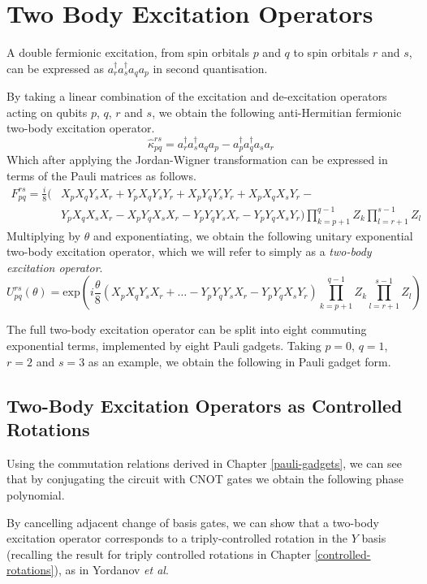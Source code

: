 \section{Two Body Excitation Operators}%
\label{two-body-excitation-operators}

A double fermionic excitation, from spin orbitals $p$ and $q$ to spin orbitals $r$ and $s$, can be expressed as $a^\dagger_r a^\dagger_s a_q a_p$ in second quantisation.

By taking a linear combination of the excitation and de-excitation operators acting on qubits $p$, $q$, $r$ and $s$, we obtain the following anti-Hermitian fermionic two-body excitation operator.
\begin{equation*}
    \hat{\kappa}_{pq}^{rs} = a^\dagger_r a^\dagger_s a_q a_p - a^\dagger_p a^\dagger_q a_s a_r
\end{equation*}
Which after applying the Jordan-Wigner transformation can be expressed in terms of the Pauli matrices as follows.
\begin{align*}
    F_{pq}^{rs} = \frac{i}{8} (
      & X_p X_q Y_s X_r +
        Y_p X_q Y_s Y_r +
        X_p Y_q Y_s Y_r +
        X_p X_q X_s Y_r - \\
      & Y_p X_q X_s X_r -
        X_p Y_q X_s X_r -
        Y_p Y_q Y_s X_r -
        Y_p Y_q X_s Y_r )
    \prod_{k=p+1}^{q-1} Z_k
    \prod_{l=r+1}^{s-1} Z_l
\end{align*}
Multiplying by $\theta$ and exponentiating, we obtain the following unitary exponential two-body excitation operator, which we will refer to simply as a \textit{two-body excitation operator}.
\begin{equation*}
    U^{rs}_{pq} (\theta) = \text{exp} \left( i \frac{\theta}{8} (
    X_p X_q Y_s X_r
    + \dots -
    Y_p Y_q Y_s X_r -
    Y_p Y_q X_s Y_r )
    \prod_{k=p+1}^{q-1} Z_k
    \prod_{l=r+1}^{s-1} Z_l
    \right)
\end{equation*}

The full two-body excitation operator can be split into eight commuting exponential terms, implemented by eight Pauli gadgets. Taking $p=0$, $q=1$, $r=2$ and $s=3$ as an example, we obtain the following in Pauli gadget form.



\subsection{Two-Body Excitation Operators as Controlled Rotations}

Using the commutation relations derived in Chapter \ref{pauli-gadgets}, we can see that by conjugating the circuit with CNOT gates we obtain the following phase polynomial.


By cancelling adjacent change of basis gates, we can show that a two-body excitation operator corresponds to a triply-controlled rotation in the $Y$ basis (recalling the result for triply controlled rotations in Chapter \ref{controlled-rotations}), as in Yordanov \textit{et al}.

